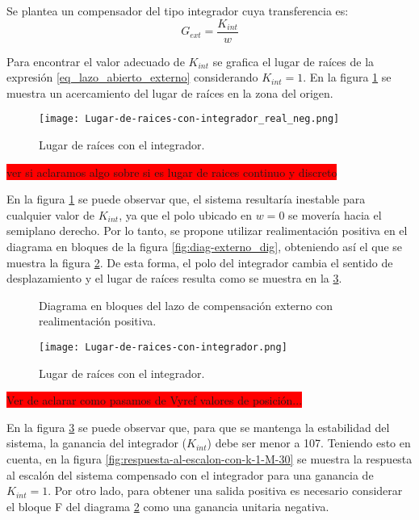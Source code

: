 Se plantea un compensador del tipo integrador cuya transferencia es:
\begin{equation}
	G_{ext}= \frac{K_{int}}{w}
\end{equation}


Para encontrar el valor adecuado de $K_{int}$ se grafica el lugar de raíces de la expresión \ref{eq_lazo_abierto_externo} considerando $K_{int}=1$. En la figura \ref{fig:lugar-de-raices-con-integrador_real_neg} se muestra un acercamiento del lugar de raíces en la zona del origen.


\begin{figure}[H]
	\centering
	\texttt{[image: Lugar-de-raices-con-integrador\_real\_neg.png]}
	\caption{Lugar de raíces con el integrador.}
	\label{fig:lugar-de-raices-con-integrador_real_neg}
\end{figure}

\colorbox{red}{ver si aclaramos algo sobre si es lugar de raices continuo y discreto}




En la figura \ref{fig:lugar-de-raices-con-integrador_real_neg} se puede observar que, el sistema resultaría inestable para cualquier valor de $K_{int}$, ya que el polo ubicado en $w=0$ se movería hacia el semiplano derecho. Por lo tanto, se propone utilizar realimentación positiva en el diagrama en bloques de la figura \ref{fig:diag-externo_dig}, obteniendo así el que se muestra la figura \ref{fig:diag-externo_real_positiva_dig}. De esta forma, el polo del integrador cambia el sentido de desplazamiento y el lugar de raíces resulta como se muestra en la \ref{fig:lugar-de-raices-con-integrador}.


\begin{figure}[H]
	\centering
	
	\caption{Diagrama en bloques del lazo de compensación externo con realimentación positiva.}	
	\label{fig:diag-externo_real_positiva_dig}
\end{figure}

\begin{figure}[H]
	\centering
	\texttt{[image: Lugar-de-raices-con-integrador.png]}
	\caption{Lugar de raíces con el integrador.}
	\label{fig:lugar-de-raices-con-integrador}
\end{figure}

\colorbox{red}{Ver de aclarar como pasamos de Vyref valores de posición...}

\noindent En la figura \ref{fig:lugar-de-raices-con-integrador} se puede observar que, para que se mantenga la estabilidad del sistema, la ganancia del integrador ($K_{int}$) debe ser menor a 107. Teniendo esto en cuenta, en la figura \ref{fig:respuesta-al-escalon-con-k-1-M-30} se muestra la respuesta al escalón del sistema compensado con el integrador para una ganancia de $K_{int}=1$. Por otro lado, para obtener una salida positiva es necesario considerar el bloque F del diagrama \ref{fig:diag-externo_real_positiva_dig} como una ganancia unitaria negativa.


